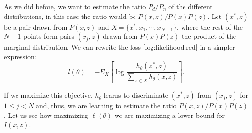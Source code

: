 As we did before, we want to estimate the ratio $P_d/P_n$ of the different distributions, in this case the ratio would be $P(x,z)/P(x)P(z)$. Let $(x^*,z)$ be a pair drawn from $P(x,z)$ and $X = \{x^*, x_1,\cdots,x_{N-1} \}$, where the rest of the $N-1$ points form pairs $(x_j,z)$ drawn from $P(x)P(z)$ the product of the marginal distribution. We can rewrite the loss \ref{log:likelihood:red} in a simpler expression:
\begin{equation}\label{log:likelihood:rewritten}
l(\theta) = - E_X \left[ \log \frac{h_\theta(x^*,z)}{\sum_{x \in X}h_\theta(x,z)}\right]  .
\end{equation}

If we maximize this objective, $h_\theta$ learns to discriminate $(x^*,z)$ from $(x_j,z)$ for $ 1 \leq j < N$ and, thus, we are learning to estimate the ratio $P(x,z)/P(x)P(z)$. Let us see how maximizing $\ell(\theta)$ we are maximizing a lower bound for $I(x,z)$.

